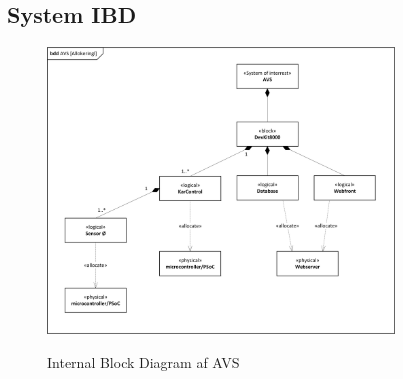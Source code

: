 \subsection{System IBD}

\begin{figure}[H]
	\centering
	\includegraphics[width=0.82\textwidth]{Systemarkitektur/System/AVS_Allokeringsdiagram.png}
	\label{fig:System BDD}
	\caption{Internal Block Diagram af AVS}
\end{figure}





